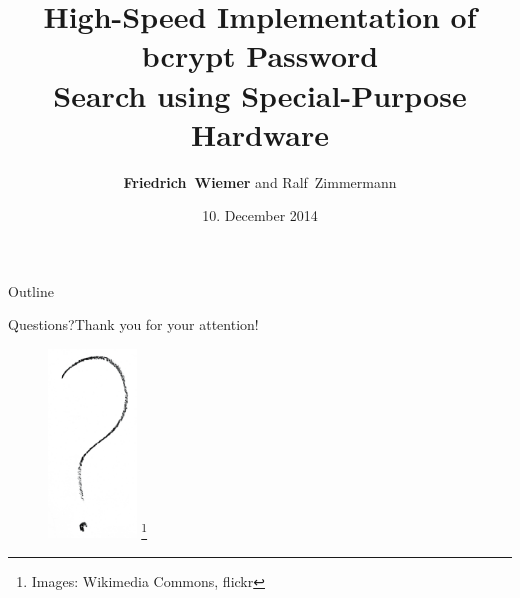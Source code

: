 \documentclass[12pt, dvisvgm]{beamer}
\title[High-Speed Implementation of bcrypt Password Search]{High-Speed Implementation of bcrypt Password \\Search using Special-Purpose Hardware}
\subtitle{}
\author[Friedrich~Wiemer and Ralf~Zimmermann]{\textbf{Friedrich~Wiemer} and Ralf~Zimmermann}
\institute
{%
	Horst Görtz Institute for IT-Security\\
	Ruhr University Bochum
}
\date{10. December 2014}
\newcommand\blfootnote[1]{%
	\begingroup
	\renewcommand\thefootnote{}\footnote{#1}%
	\addtocounter{footnote}{-1}%
	\endgroup
}
\begin{document}
\begin{frame}
	\titlepage{}
\end{frame}

\begin{frame}{Outline}
	\tableofcontents
\end{frame}



\begin{frame}{Questions?}{Thank you for your attention!}
	\begin{figure}[!htb]
		\includegraphics[height=50mm]{data/flickr/questionmark.png}\blfootnote{\scriptsize Images: Wikimedia Commons, flickr}
	\end{figure}
\end{frame}
\end{document}
